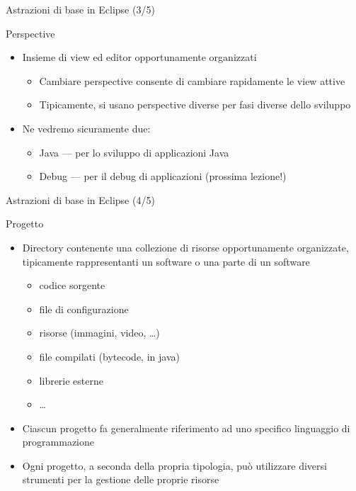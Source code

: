 \documentclass[xcolor=dvipsnames,presentation]{beamer}
\begin{document}
\begin{frame}{Astrazioni di base in Eclipse (3/5)}
\begin{block}{Perspective}
\begin{itemize}
\item Insieme di view ed editor opportunamente organizzati
\begin{itemize}
\item Cambiare perspective consente di cambiare rapidamente le view attive
\item Tipicamente, si usano perspective diverse per fasi diverse dello sviluppo
\end{itemize}
\item Ne vedremo sicuramente due:
\begin{itemize}
\item Java --- per lo sviluppo di applicazioni Java
\item Debug --- per il debug di applicazioni (prossima lezione!)
\end{itemize}
\end{itemize}
\end{block}
\end{frame}

\begin{frame}{Astrazioni di base in Eclipse (4/5)}
\begin{block}{Progetto}
\begin{itemize}
\item Directory contenente una collezione di risorse opportunamente organizzate, tipicamente rappresentanti un software o una parte di un software
\begin{itemize}
\item codice sorgente
\item file di configurazione
\item risorse (immagini, video, \dots)
\item file compilati (bytecode, in java)
\item librerie esterne
\item \dots
\end{itemize}
\item Ciascun progetto fa generalmente riferimento ad uno specifico linguaggio di programmazione
\item Ogni progetto, a seconda della propria tipologia, può utilizzare diversi strumenti per la gestione delle proprie risorse
\end{itemize}
\end{block}
\end{frame}
\end{document}
